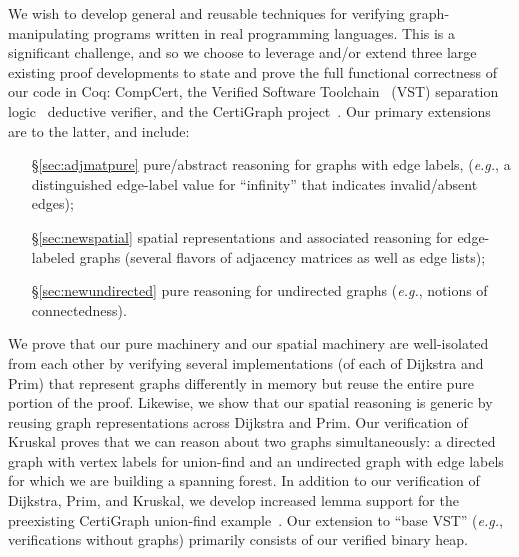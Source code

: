 We wish to develop general and reusable techniques for verifying graph-manipulating programs written in real programming languages.  This is a significant challenge, and so we choose to leverage and/or extend three large existing proof developments to state and prove the full functional correctness of our code in Coq: CompCert, the Verified Software Toolchain~\cite{appel:programlogics} (VST) separation logic~\cite{o2001local} deductive verifier, and the CertiGraph project~\cite{DBLP:journals/pacmpl/WangCMH19}.  Our primary extensions are to the latter, and include:
\begin{enumerate}
\item[\S\ref{sec:adjmatpure}] pure/abstract reasoning for graphs with edge labels,
(\emph{e.g.}, a distinguished edge-label value for ``infinity'' that indicates invalid/absent edges);
\item[\S\ref{sec:newspatial}] spatial representations and associated reasoning for edge-labeled graphs (several flavors of adjacency matrices as well as edge lists);
\item[\S\ref{sec:newundirected}] pure reasoning for undirected graphs (\emph{e.g.}, notions of connectedness).
\end{enumerate}
We prove that our pure machinery and our spatial machinery are well-isolated from each other by verifying several implementations (of each of Dijkstra and Prim) that represent graphs differently in memory but reuse the entire pure portion of the proof.  Likewise, we show that our spatial reasoning is generic by reusing graph representations across Dijkstra and Prim.  Our verification of Kruskal proves that we can reason about two graphs simultaneously: a directed graph with vertex labels for union-find and an undirected graph with edge labels for which we are building a spanning forest.
In addition to our verification of Dijkstra, Prim, and Kruskal, we develop increased lemma support for the preexisting CertiGraph union-find example~\cite{DBLP:journals/pacmpl/WangCMH19}.  Our extension to ``base VST'' (\emph{e.g.}, verifications without graphs) primarily consists of our verified binary heap.



